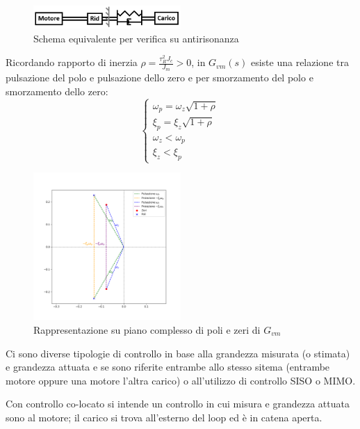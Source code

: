 \begin{figure}[h]
    \centering
    \includegraphics[width=0.5\textwidth]{Immagini/schema_antirisonanza.png}
    \caption{Schema equivalente per verifica su antirisonanza}
\end{figure}

Ricordando rapporto di inerzia \(\rho = \frac{\tau_R^2 J_c}{J_m} > 0\), in \(G_{vm}(s)\) esiste una relazione tra pulsazione del polo e pulsazione dello zero e per smorzamento del polo e smorzamento dello zero:
\[
\begin{cases}
    \omega_p = \omega_z \sqrt{1+\rho} \\
    \xi_p = \xi_z \sqrt{1+\rho} \\
    \omega_z < \omega_p \\
    \xi_z < \xi_p
\end{cases}
\]

\begin{figure}[h]
    \centering
    \includegraphics[width=0.5\textwidth]{Immagini/poli_zeri_Gvm.png}
    \caption{Rappresentazione su piano complesso di poli e zeri di \(G_{vm}\)}
\end{figure}

Ci sono diverse tipologie di controllo in base alla grandezza misurata (o stimata) e grandezza attuata e se sono riferite entrambe allo stesso sitema (entrambe motore oppure una motore l'altra carico) o all'utilizzo di controllo SISO o MIMO.

Con controllo co-locato si intende un controllo in cui misura e grandezza attuata sono al motore; il carico si trova all'esterno del loop ed è in catena aperta.

